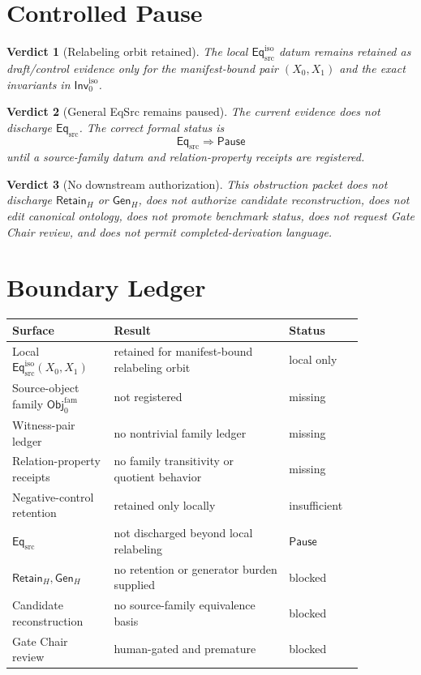 \documentclass[11pt]{article}
\newcommand{\ObjFam}{\mathsf{Obj}_{0}^{\mathrm{fam}}}
\newcommand{\Inv}{\mathsf{Inv}_{0}^{\mathrm{iso}}}
\newcommand{\EqSrc}{\mathsf{Eq}_{\mathrm{src}}}
\newcommand{\EqIso}{\mathsf{Eq}_{\mathrm{src}}^{\mathrm{iso}}}
\newcommand{\GenH}{\mathsf{Gen}_{H}}
\newcommand{\RetainH}{\mathsf{Retain}_{H}}
\newcommand{\Pause}{\mathsf{Pause}}
\newtheorem{verdict}{Verdict}
\begin{document}
\section{Controlled Pause}

\begin{verdict}[Relabeling orbit retained]
The local \(\EqIso\) datum remains retained as draft/control evidence only
for the manifest-bound pair \((X_{0},X_{1})\) and the exact invariants in
\(\Inv\).
\end{verdict}

\begin{verdict}[General EqSrc remains paused]
The current evidence does not discharge \(\EqSrc\). The correct formal
status is
\[
    \EqSrc \Rightarrow \Pause
\]
until a source-family datum and relation-property receipts are registered.
\end{verdict}

\begin{verdict}[No downstream authorization]
This obstruction packet does not discharge \(\RetainH\) or \(\GenH\), does
not authorize candidate reconstruction, does not edit canonical ontology,
does not promote benchmark status, does not request Gate Chair review, and
does not permit completed-derivation language.
\end{verdict}

\section{Boundary Ledger}

\begin{center}
\begin{tabular}{p{0.25\linewidth}p{0.43\linewidth}p{0.18\linewidth}}
\textbf{Surface} & \textbf{Result} & \textbf{Status} \\
\hline
Local \(\EqIso(X_{0},X_{1})\) & retained for manifest-bound relabeling orbit & local only \\
Source-object family \(\ObjFam\) & not registered & missing \\
Witness-pair ledger & no nontrivial family ledger & missing \\
Relation-property receipts & no family transitivity or quotient behavior & missing \\
Negative-control retention & retained only locally & insufficient \\
\(\EqSrc\) & not discharged beyond local relabeling & \(\Pause\) \\
\(\RetainH,\GenH\) & no retention or generator burden supplied & blocked \\
Candidate reconstruction & no source-family equivalence basis & blocked \\
Gate Chair review & human-gated and premature & blocked \\
\end{tabular}
\end{center}
\end{document}
